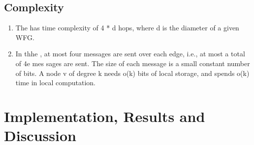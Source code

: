 \documentclass[letterpaper,10pt,english]{sphinxmanual}
\begin{document}
\subsection{Complexity}
\label{\detokenize{docs/BrachaToueg/algorithm:complexity}}\begin{enumerate}
%
\item {} 
\sphinxAtStartPar
{} The {\hyperref[\detokenize{docs/BrachaToueg/algorithm:brachatouegdeadlockdetectionalgorithm}]{}} has time complexity of 4 * d hops, where d is the diameter of a given WFG. 

\item {} 
\sphinxAtStartPar
{} In thhe {\hyperref[\detokenize{docs/BrachaToueg/algorithm:brachatouegdeadlockdetectionalgorithm}]{}}, at most four messages are sent over each edge, i.e., at most a total of 4e mes\sphinxhyphen{} sages are sent. The size of each message is a small constant number of bits. A node v of degree k needs o(k) bits of local storage, and spends o(k) time in local computation. 

\end{enumerate}

\sphinxstepscope


\section{Implementation, Results and Discussion}
\label{\detokenize{docs/BrachaToueg/results:implementation-results-and-discussion}}\label{\detokenize{docs/BrachaToueg/results::doc}}
\end{document}
